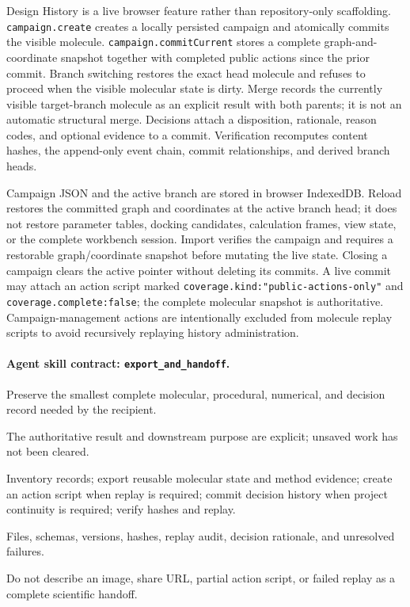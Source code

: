 \begin{small}
Design History is a live browser feature rather than repository-only scaffolding. \texttt{campaign.create} creates a locally persisted campaign and atomically commits the visible molecule. \texttt{campaign.commitCurrent} stores a complete graph-and-coordinate snapshot together with completed public actions since the prior commit. Branch switching restores the exact head molecule and refuses to proceed when the visible molecular state is dirty. Merge records the currently visible target-branch molecule as an explicit result with both parents; it is not an automatic structural merge. Decisions attach a disposition, rationale, reason codes, and optional evidence to a commit. Verification recomputes content hashes, the append-only event chain, commit relationships, and derived branch heads.

Campaign JSON and the active branch are stored in browser IndexedDB. Reload restores the committed graph and coordinates at the active branch head; it does not restore parameter tables, docking candidates, calculation frames, view state, or the complete workbench session. Import verifies the campaign and requires a restorable graph/coordinate snapshot before mutating the live state. Closing a campaign clears the active pointer without deleting its commits. A live commit may attach an action script marked \texttt{coverage.kind:"public-actions-only"} and \texttt{coverage.complete:false}; the complete molecular snapshot is authoritative. Campaign-management actions are intentionally excluded from molecule replay scripts to avoid recursively replaying history administration.

\paragraph{Agent skill contract: \texttt{export\_and\_handoff}.}

\begin{description}[leftmargin=2.2cm,style=nextline]
\item[Goal] Preserve the smallest complete molecular, procedural, numerical, and decision record needed by the recipient.
\item[Preconditions] The authoritative result and downstream purpose are explicit; unsaved work has not been cleared.
\item[Procedure] Inventory records; export reusable molecular state and method evidence; create an action script when replay is required; commit decision history when project continuity is required; verify hashes and replay.
\item[Evidence] Files, schemas, versions, hashes, replay audit, decision rationale, and unresolved failures.
\item[Stop] Do not describe an image, share URL, partial action script, or failed replay as a complete scientific handoff.
\end{description}


\end{small}
